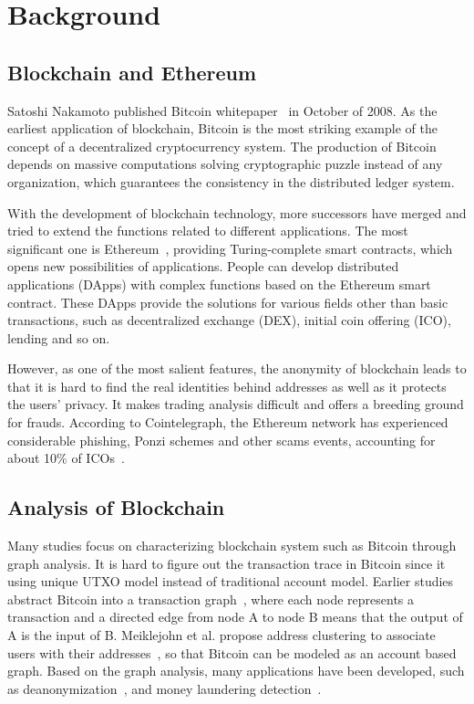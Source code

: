 
\section{Background}
\subsection{Blockchain and Ethereum}
Satoshi Nakamoto published Bitcoin whitepaper~\cite{Nakamoto2008} in October of 2008. As the earliest application of blockchain, Bitcoin is the most striking example of the concept of a decentralized cryptocurrency system. The production of Bitcoin depends on massive computations solving cryptographic puzzle instead of any organization, which guarantees the consistency in the distributed ledger system.

With the development of blockchain technology, more successors have merged and tried to extend the functions related to different applications. The most significant one is Ethereum~\cite{buterin2013ethereum}, providing Turing-complete smart contracts, which opens new possibilities of applications. People can develop distributed applications (DApps) with complex functions based on the Ethereum smart contract. These DApps provide the solutions for various fields other than basic transactions, such as decentralized exchange (DEX), initial coin offering (ICO), lending and so on.

However, as one of the most salient features, the anonymity of blockchain leads to that it is hard to find the real identities behind addresses as well as it protects the users' privacy. It makes trading analysis difficult and offers a breeding ground for frauds. According to Cointelegraph, the Ethereum network has experienced considerable phishing, Ponzi schemes and other scams events, accounting for about 10\% of ICOs~\cite{cerchiello2018icos}.

\subsection{Analysis of Blockchain}
Many studies focus on characterizing blockchain system such as Bitcoin through graph analysis. It is hard to figure out the transaction trace in Bitcoin since it using unique UTXO model instead of traditional account model. Earlier studies abstract Bitcoin into a transaction graph~\cite{reid2013analysis}, where each node represents a transaction and a directed edge from node A to node B means that the output of A is the input of B. Meiklejohn et al. propose address clustering to associate users with their addresses~\cite{meiklejohn2013fistful}, so that Bitcoin can be modeled as an account based graph. Based on the graph analysis, many applications have been developed, such as deanonymization~\cite{reid2013analysis}, and money laundering detection~\cite{zhao2015graph,maesa2016analysis,ranshous2017exchange}. 

